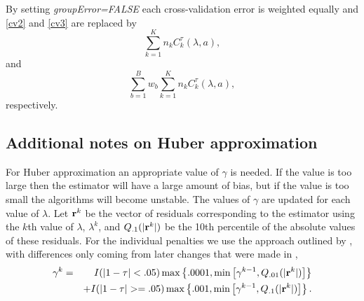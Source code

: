\documentclass[article]{rqPenVignette}%
\newcommand{\vr}{{\bf r}}
\begin{document}

By setting \emph{groupError=FALSE} each cross-validation error is weighted equally and \eqref{cv2} and \eqref{cv3} are replaced by 
\begin{equation}
\label{gf1}
\sum_{k=1}^K n_k C_k^\tau(\lambda,a),
\end{equation}
and
\begin{equation}
\label{gf2}
\sum_{b=1}^B w_b \sum_{k=1}^K n_k C_k^\tau(\lambda,a),
\end{equation}
respectively. 



\subsection{Additional notes on Huber approximation}

For Huber approximation an appropriate value of $\gamma$ is needed. If the value is too large then the estimator will have a large amount of bias, but if the value is too small the algorithms will become unstable. The values of $\gamma$ are updated for each value of $\lambda$. Let $\vr^k$ be the vector of residuals corresponding to the estimator using the $k$th value of $\lambda$, $\lambda^k$, and $Q_{.1}(|\vr^k|)$ be the 10th percentile of the absolute values of these residuals. For the individual penalties we use the approach outlined by \citet{huber_cd}, with differences only coming from later changes that were made in ,
\begin{eqnarray*}
\gamma^k &=& I(|1-\tau|< .05)\max\left\{.0001,\min\left[\gamma^{k-1},Q_{.01}(|\vr^k|)\right]\right\} \\
&& + I(|1-\tau|>=.05)\max\left\{.001,\min\left[\gamma^{k-1},Q_{.1}(|\vr^k|)\right]\right\}.
\end{eqnarray*}
\end{document}
